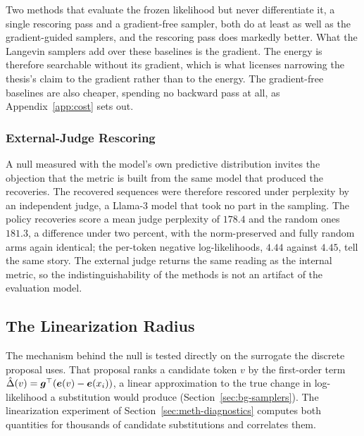 Two methods that evaluate the frozen likelihood but never differentiate it, a single rescoring pass and a gradient-free sampler, both do at least as well as the gradient-guided samplers, and the rescoring pass does markedly better. What the Langevin samplers add over these baselines is the gradient. The energy is therefore searchable without its gradient, which is what licenses narrowing the thesis's claim to the gradient rather than to the energy. The gradient-free baselines are also cheaper, spending no backward pass at all, as Appendix~\ref{app:cost} sets out.

\subsubsection{External-Judge Rescoring}
\label{sec:results-judge}

A null measured with the model's own predictive distribution invites the objection that the metric is built from the same model that produced the recoveries. The recovered sequences were therefore rescored under perplexity by an independent judge, a Llama-3 model that took no part in the sampling. The policy recoveries score a mean judge perplexity of $178.4$ and the random ones $181.3$, a difference under two percent, with the norm-preserved and fully random arms again identical; the per-token negative log-likelihoods, $4.44$ against $4.45$, tell the same story.
The external judge returns the same reading as the internal metric, so the indistinguishability of the methods is not an artifact of the evaluation model.

\subsection{The Linearization Radius}
\label{sec:results-linradius}

The mechanism behind the null is tested directly on the surrogate the discrete proposal uses. That proposal ranks a candidate token $v$ by the first-order term $\hat{\Delta}(v) = \bm{g}^\top(\bm{e}(v) - \bm{e}(x_i))$, a linear approximation to the true change in log-likelihood a substitution would produce (Section~\ref{sec:bg-samplers}). The linearization experiment of Section~\ref{sec:meth-diagnostics} computes both quantities for thousands of candidate substitutions and correlates them.

